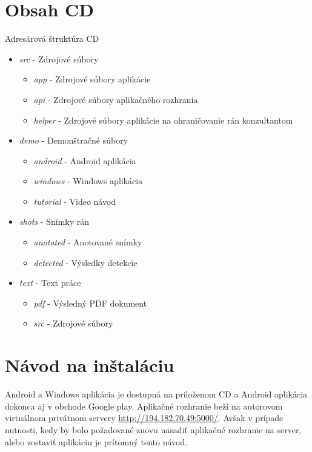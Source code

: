 \chapter{Obsah CD}
\label{pr:cd}
Adresárová štruktúra CD
\begin{itemize}
\item \textit{src} - Zdrojové súbory 
    \begin{itemize}
    \item \textit{app} - Zdrojové súbory aplikácie
    \item \textit{api} - Zdrojové súbory aplikačného rozhrania
    \item \textit{helper} - Zdrojové súbory aplikácie na ohraničovanie rán konzultantom
    \end{itemize}
\item \textit{demo} - Demonštračné súbory
    \begin{itemize}
    \item \textit{android} - Android aplikácia
    \item \textit{windows} - Windows aplikácia
    \item \textit{tutorial} - Video návod
    \end{itemize}
\item \textit{shots} - Snímky rán
    \begin{itemize}
    \item \textit{anotated} - Anotované snímky
    \item \textit{detected} - Výsledky detekcie
    \end{itemize}
\item \textit{text} - Text práce
    \begin{itemize}
    \item \textit{pdf} - Výsledný PDF dokument
    \item \textit{src} - Zdrojové súbory
    \end{itemize}
\end{itemize}

\chapter{Návod na inštaláciu}
Android a Windows aplikácia je dostupná na priloženom CD a Android aplikácia dokonca aj v obchode Google play. Aplikačné rozhranie beží na autorovom virtuálnom privátnom servery \url{http://194.182.70.49:5000/}. Avšak v prípade nutnosti, kedy by bolo požadované znovu nasadiť aplikačné rozhranie na server, alebo zostaviť aplikáciu je prítomný tento návod. 


